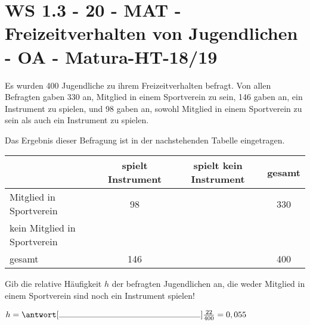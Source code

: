 \section{WS 1.3 - 20 - MAT - Freizeitverhalten von Jugendlichen - OA - Matura-HT-18/19}

\begin{beispiel}[WS 1.3]{1}
Es wurden 400 Jugendliche zu ihrem Freizeitverhalten befragt. Von allen Befragten gaben 330 an,
Mitglied in einem Sportverein zu sein, 146 gaben an, ein Instrument zu spielen, und 98 gaben an,
sowohl Mitglied in einem Sportverein zu sein als auch ein Instrument zu spielen.\leer

Das Ergebnis dieser Befragung ist in der nachstehenden Tabelle eingetragen.


\begin{center}
\begin{tabu}{|l|c|c|c|} 
& spielt Instrument &  spielt kein Instrument &gesamt \\ \hline
Mitglied in Sportverein & 98 &  & 330 \\ \hline
kein Mitglied in Sportverein & &  &  \\ \hline
gesamt & 146 & & 400 \\ \hline
\end{tabu}
\end{center}

Gib die relative Häufigkeit $h$ der befragten Jugendlichen an, die weder Mitglied in einem
Sportverein sind noch ein Instrument spielen!\leer

$h=\antwort[\rule{6cm}{0.3pt}]{\frac{22}{400}=0,055}$

\end{beispiel}